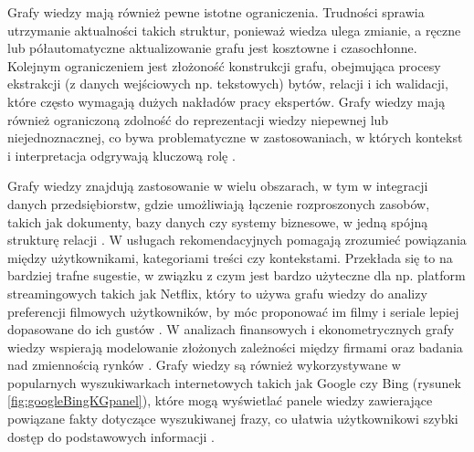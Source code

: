 \documentclass[
a4paper,
12pt,
]{article}
\begin{document}
Grafy wiedzy mają również pewne istotne ograniczenia. 
Trudności sprawia 
utrzymanie aktualności takich struktur, ponieważ wiedza ulega zmianie, a ręczne lub półautomatyczne aktualizowanie grafu jest kosztowne i czasochłonne. Kolejnym ograniczeniem jest złożoność konstrukcji grafu, obejmująca procesy ekstrakcji (z danych wejściowych np. tekstowych) bytów, relacji i ich walidacji, które często wymagają dużych nakładów pracy ekspertów. Grafy wiedzy mają również ograniczoną zdolność do reprezentacji wiedzy niepewnej lub niejednoznacznej, co bywa problematyczne w zastosowaniach, w których kontekst i interpretacja odgrywają kluczową rolę \cite{graph:llm:roadmap}.

Grafy wiedzy znajdują zastosowanie w wielu obszarach, w tym w integracji danych przedsiębiorstw, gdzie umożliwiają łączenie rozproszonych zasobów, takich jak dokumenty, bazy danych czy systemy biznesowe, w jedną spójną strukturę relacji \cite{kg:buisness}. W usługach rekomendacyjnych pomagają zrozumieć powiązania między użytkownikami, kategoriami treści czy kontekstami. Przekłada się to na bardziej trafne sugestie, w związku z czym jest bardzo użyteczne dla np. platform streamingowych takich jak Netflix, który to używa grafu wiedzy do analizy preferencji filmowych użytkowników, by móc proponować im filmy i seriale lepiej dopasowane do ich gustów \cite{kg:netflix}.
W analizach finansowych i ekonometrycznych grafy wiedzy wspierają modelowanie złożonych zależności między firmami oraz badania nad zmiennością rynków \cite{kg:evolution}. 
Grafy wiedzy są również wykorzystywane w popularnych wyszukiwarkach internetowych takich jak Google czy Bing (rysunek \ref{fig:googleBingKGpanel}), które mogą wyświetlać panele wiedzy zawierające powiązane fakty dotyczące wyszukiwanej frazy, co ułatwia użytkownikowi szybki dostęp do podstawowych informacji \cite{kg:buisness}.
\end{document}
